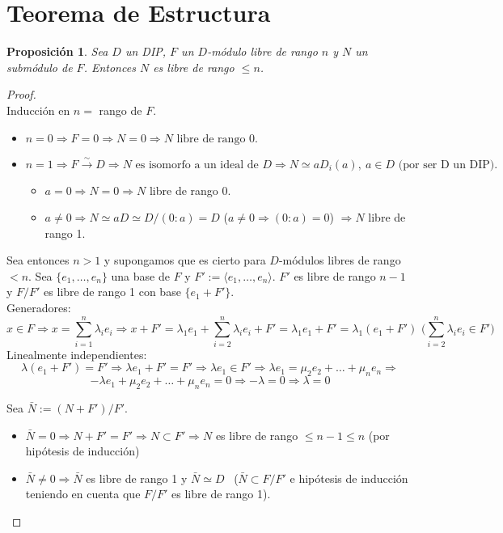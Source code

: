 \documentclass{article}
\theoremstyle{theorem-style}  %
\newtheorem{proposition}[theorem]{Proposición}
\theoremstyle{definition}
\theoremstyle{example-style}
\begin{document}
	\section{Teorema de Estructura}
	\begin{proposition}
		Sea $D$ un DIP, $F$ un $D$-módulo libre de rango $n$ y $N$ un submódulo de $F$. Entonces $N$ es libre de rango $\leq n$.
	\end{proposition}

	\begin{proof}\ \\
		Inducción en $n=$ rango de $F$.
		\begin{itemize}
			\item $n=0\Rightarrow F=0\Rightarrow N=0 \Rightarrow N \text{ libre de rango } 0.$
			\item $n=1 \Rightarrow F \xrightarrow{\sim} D \Rightarrow N \text{ es isomorfo a un ideal de } D \Rightarrow N\simeq aD_i(a), \ a\in D \text{ (por ser D un DIP)}.$
			\begin{itemize}
				\item $a=0 \Rightarrow N=0 \Rightarrow N$ libre de rango 0.
				\item $a\neq 0 \Rightarrow N\simeq aD\simeq D/(0:a) = D$ ($a\neq 0 \Rightarrow (0:a)=0$) $\Rightarrow N$ libre de rango 1.
			\end{itemize}
		\end{itemize}
		Sea entonces $n>1$ y supongamos que es cierto para $D$-módulos libres de rango $<n$. Sea $\{e_1,\dots,e_n\}$ una base de $F$ y $F':=\langle e_1,\dots,e_n\rangle$. $F'$ es libre de rango $n-1$ y $F/F'$ es libre de rango 1 con base $\{e_1+F'\}$.\\
		Generadores:
		\[x\in F \Rightarrow x=\sum_{i=1}^n\lambda_i e_i \Rightarrow x+F' = \lambda_1 e_1 + \sum_{i=2}^n\lambda_i e_i + F' = \lambda_1 e_1 + F' = \lambda_1(e_1+F') \text{ \ \ ($\sum_{i=2}^n \lambda_i e_i \in F'$) }\]
		Linealmente independientes:
		\[\lambda(e_1+F')=F'\Rightarrow \lambda e_1+F'=F' \Rightarrow \lambda e_1 \in F' \Rightarrow \lambda e_1 = \mu_2e_2+\dots+\mu_ne_n \Rightarrow\]
		\[ -\lambda e_1+\mu_2e_2+\dots+\mu_ne_n=0 \Rightarrow -\lambda=0 \Rightarrow \lambda = 0\]

		Sea $\bar{N}:=(N+F')/F'$.
		\begin{itemize}
			\item $\bar{N}=0 \Rightarrow N+F'=F' \Rightarrow N\subset F' \Rightarrow N$ es libre de rango $\leq n-1 \leq n$ (por hipótesis de inducción)
			\item $\bar{N}\neq 0 \Rightarrow \bar{N}$ es libre de rango 1 y $\bar{N}\simeq D$ \  ($\bar{N}\subset F/F'$ e hipótesis de inducción teniendo en cuenta que $F/F'$ es libre de rango 1).
		\end{itemize}


\end{proof}
\end{document}

